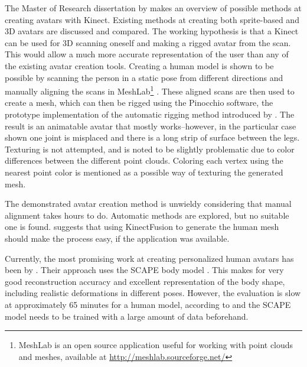 The Master of Research dissertation by \citet{charpentier2011accurate} makes an overview of possible methods at creating avatars with Kinect. Existing methods at creating both sprite-based and 3D avatars are discussed and compared. The working hypothesis is that a Kinect can be used for 3D scanning oneself and making a rigged avatar from the scan. This would allow a much more accurate representation of the user than any of the existing avatar creation tools. Creating a human model is shown to be possible by scanning the person in a static pose from different directions and manually aligning the scans in MeshLab\footnote{MeshLab is an open source application useful for working with point clouds and meshes, available at \url{http://meshlab.sourceforge.net/}} \citep{meshlab}. These aligned scans are then used to create a mesh, which can then be rigged using the Pinocchio software, the prototype implementation of the automatic rigging method introduced by \citep{baran2007automatic}. The result is an animatable avatar that mostly works--however, in the particular case shown one joint is misplaced and there is a long strip of surface between the legs. Texturing is not attempted, and is noted to be slightly problematic due to color differences between the different point clouds. Coloring each vertex using the nearest point color is mentioned as a possible way of texturing the generated mesh. \citep{charpentier2011accurate}

The demonstrated avatar creation method is unwieldy considering that manual alignment takes hours to do. Automatic methods are explored, but no suitable one is found. \citeauthor{charpentier2011accurate} suggests that using KinectFusion to generate the human mesh should make the process easy, if the application was available. \citep{charpentier2011accurate}


Currently, the most promising work at creating personalized human avatars has been by \citet{weiss2011home}. Their approach uses the SCAPE body model \citep{anguelov2005scape}. This makes for very good reconstruction accuracy and excellent representation of the body shape, including realistic deformations in different poses. However, the evaluation is slow at approximately 65 minutes for a human model, according to \citet{weiss2011home} and the SCAPE model needs to be trained with a large amount of data beforehand.

